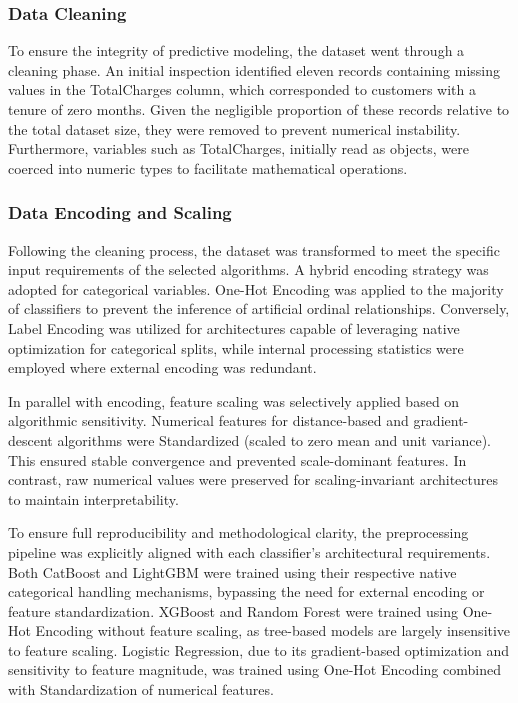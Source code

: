 \documentclass[a4paper,twoside]{article}
\begin{document}
\subsubsection{Data Cleaning}

To ensure the integrity of predictive modeling, the dataset went through a cleaning phase. An initial inspection identified eleven records containing missing values in the TotalCharges column, which corresponded to customers with a tenure of zero months. Given the negligible proportion of these records relative to the total dataset size, they were removed to prevent numerical instability. Furthermore, variables such as TotalCharges, initially read as objects, were coerced into numeric types to facilitate mathematical operations.

\subsubsection{Data Encoding and Scaling}

Following the cleaning process, the dataset was transformed to meet the specific input requirements of the selected algorithms. A hybrid encoding strategy was adopted for categorical variables. One-Hot Encoding was applied to the majority of classifiers to prevent the inference of artificial ordinal relationships. Conversely, Label Encoding was utilized for architectures capable of leveraging native optimization for categorical splits, while internal processing statistics were employed where external encoding was redundant.

In parallel with encoding, feature scaling was selectively applied based on algorithmic sensitivity. Numerical features for distance-based and gradient-descent algorithms were Standardized (scaled to zero mean and unit variance). This ensured stable convergence and prevented scale-dominant features. In contrast, raw numerical values were preserved for scaling-invariant architectures to maintain interpretability.

To ensure full reproducibility and methodological clarity, the preprocessing pipeline was explicitly aligned with each classifier's architectural requirements. Both CatBoost and LightGBM were trained using their respective native categorical handling mechanisms, bypassing the need for external encoding or feature standardization. XGBoost and Random Forest were trained using One-Hot Encoding without feature scaling, as tree-based models are largely insensitive to feature scaling. Logistic Regression, due to its gradient-based optimization and sensitivity to feature magnitude, was trained using One-Hot Encoding combined with Standardization of numerical features.
\end{document}
